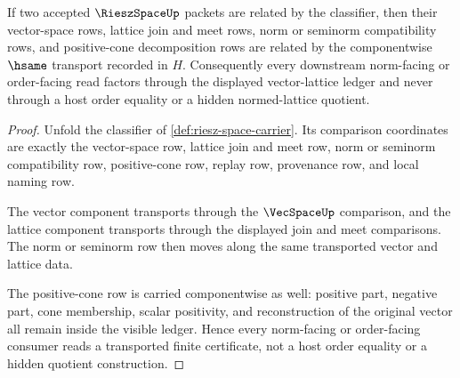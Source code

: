 \begin{theorem}
\label{thm:riesz-space-lattice-norm-compatibility}
If two accepted $\RieszSpaceUp$ packets are related by the classifier, then their vector-space rows, lattice join and meet rows, norm or seminorm compatibility rows, and positive-cone decomposition rows are related by the componentwise $\hsame$ transport recorded in $H$. Consequently every downstream norm-facing or order-facing read factors through the displayed vector-lattice ledger and never through a host order equality or a hidden normed-lattice quotient.
\end{theorem}
\begin{proof}
Unfold the classifier of \autoref{def:riesz-space-carrier}. Its comparison coordinates are exactly the vector-space row, lattice join and meet row, norm or seminorm compatibility row, positive-cone row, replay row, provenance row, and local naming row.

The vector component transports through the $\VecSpaceUp$ comparison, and the lattice component transports through the displayed join and meet comparisons. The norm or seminorm row then moves along the same transported vector and lattice data.

The positive-cone row is carried componentwise as well: positive part, negative part, cone membership, scalar positivity, and reconstruction of the original vector all remain inside the visible ledger. Hence every norm-facing or order-facing consumer reads a transported finite certificate, not a host order equality or a hidden quotient construction.
\end{proof}


\begin{closurestatus}{\RieszSpaceUp}
  \theoryclosure{\seedClosure}
  \formalstatus{\unformalizedV}
\end{closurestatus}
